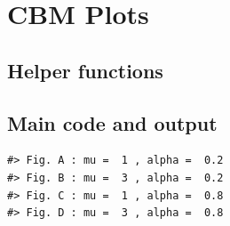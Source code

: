 \documentclass[]{book}
\begin{document}
\hypertarget{CbmPlots}{%
\chapter{CBM Plots}\label{CbmPlots}}

\hypertarget{helper-functions-2}{%
\section{Helper functions}\label{helper-functions-2}}

\hypertarget{main-code-and-output-2}{%
\section{Main code and output}\label{main-code-and-output-2}}

\begin{verbatim}
#> Fig. A : mu =  1 , alpha =  0.2
#> Fig. B : mu =  3 , alpha =  0.2
#> Fig. C : mu =  1 , alpha =  0.8
#> Fig. D : mu =  3 , alpha =  0.8
\end{verbatim}
\end{document}
